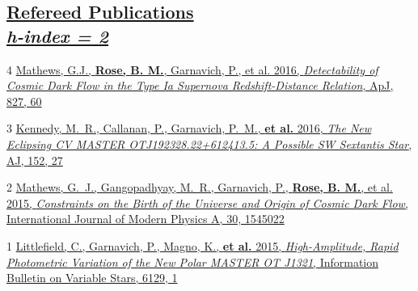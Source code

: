 \documentclass[margin]{res}
\begin{document}
\begin{resume}
\section{\href{https://ui.adsabs.harvard.edu/\#search/q=orcid\%3A\%220000-0002-1873-8973\%22&sort=date\%20desc\%2C\%20bibcode\%20desc}{Refereed Publications \\ \href{https://scholar.google.com/citations?hl=en&user=7mgK134AAAAJ&view_op=list_works&gmla=AJsN-F6iePLN4Wjqx0zevRVxlzTXpDc-4tgHh3F1l7HgQKDk5_zZb36GX5SIz-2kA3vZQ80qinI8RGivZtpLqS9oI6iUuXFfSbvz_aHJrcP1iCaBmNpgHB0}{\normalfont \textit{\small{h-index = 2}}}} }

\hangindent=15pt {\footnotesize \textcolor{light-gray}{4}} \href{https://ui.adsabs.harvard.edu/#abs/2016ApJ...827...60M/abstract}{Mathews, G.J., {\bf Rose, B. M.}, Garnavich, P., et al. 2016, {\sl Detectability of Cosmic Dark Flow in the Type Ia Supernova Redshift-Distance Relation}, ApJ, 827, 60}

\vspace{-12pt}
\hangindent=15pt {\footnotesize \textcolor{light-gray}{3}} \href{https://ui.adsabs.harvard.edu/#abs/2016AJ....152...27K/abstract}{Kennedy, M.~R., Callanan, P., Garnavich, P.~M., {\bf et al.} 2016, {\sl The New Eclipsing CV MASTER OTJ192328.22+612413.5: A Possible SW Sextantis Star}, AJ, 152, 27}

\vspace{-12pt}
\hangindent=15pt {\footnotesize \textcolor{light-gray}{2}} \href{https://ui.adsabs.harvard.edu/#abs/2015IJMPA..3045022M/abstract}{Mathews, G.~J., Gangopadhyay, M.~R., Garnavich, P., {\bf Rose, B. M.}, et al. 2015, {\sl Constraints on the Birth of the Universe and Origin of Cosmic Dark Flow}, International Journal of Modern Physics A, 30, 1545022}

\vspace{-12pt}
\hangindent=15pt {\footnotesize \textcolor{light-gray}{1}} \href{https://ui.adsabs.harvard.edu/#abs/2015IBVS.6129....1L/abstract}{Littlefield, C., Garnavich, P., Magno, K., {\bf et al.} 2015, {\sl High-Amplitude, Rapid Photometric Variation of the New Polar MASTER OT J1321}, Information Bulletin on Variable Stars, 6129, 1}






\end{resume}
\end{document}
